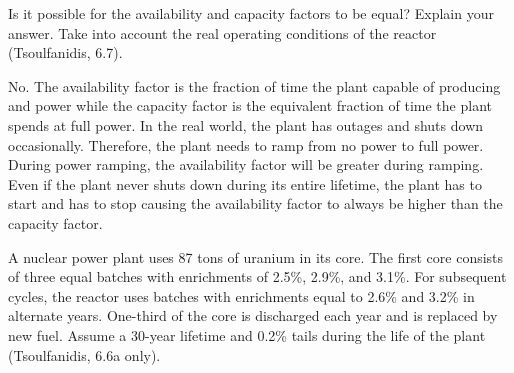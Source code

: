\documentclass[11pt,answers,addpoints]{exam}
\begin{document}
\begin{questions}
        \question[10] Is it possible for the availability and capacity factors to 
        be equal? Explain your answer. Take into account the real operating 
        conditions of the reactor (Tsoulfanidis, 6.7).
        \begin{solution}
        No. The availability factor is the fraction of time the plant capable of producing and power while the capacity factor is the equivalent fraction of time the plant spends at full power. In the real world, the plant has outages and shuts down occasionally. Therefore, the plant needs to ramp from no power to full power. During power ramping, the availability factor will be greater during ramping. Even if the plant never shuts down during its entire lifetime, the plant has to start and has to stop causing the availability factor to always be higher than the capacity factor.
        \end{solution}

        \question A nuclear power plant uses 87 tons of uranium in its 
        core. The first core consists of three equal batches with enrichments 
        of 2.5\%, 2.9\%, and 3.1\%. For subsequent cycles, the reactor uses 
        batches with enrichments equal to 2.6\% and 3.2\% in alternate years. 
        One-third of the core is discharged each year and is replaced by new 
        fuel. Assume a 30-year lifetime and 0.2\% tails during the life of the 
        plant (Tsoulfanidis, 6.6a only). 

\end{questions}
\end{document}
